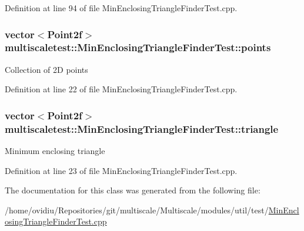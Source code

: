 Definition at line 94 of file Min\-Enclosing\-Triangle\-Finder\-Test.\-cpp.

\hypertarget{classmultiscaletest_1_1MinEnclosingTriangleFinderTest_ace108c67a933a0d79c05b304a9683764}{
\subsubsection[{points}]{\setlength{\rightskip}{0pt plus 5cm}vector$<$Point2f$>$ multiscaletest\-::\-Min\-Enclosing\-Triangle\-Finder\-Test\-::points\hspace{0.3cm}{\ttfamily [protected]}}}\label{classmultiscaletest_1_1MinEnclosingTriangleFinderTest_ace108c67a933a0d79c05b304a9683764}
Collection of 2\-D points 

Definition at line 22 of file Min\-Enclosing\-Triangle\-Finder\-Test.\-cpp.

\hypertarget{classmultiscaletest_1_1MinEnclosingTriangleFinderTest_a02aa9bcd10630d27293e656233e3f64e}{
\subsubsection[{triangle}]{\setlength{\rightskip}{0pt plus 5cm}vector$<$Point2f$>$ multiscaletest\-::\-Min\-Enclosing\-Triangle\-Finder\-Test\-::triangle\hspace{0.3cm}{\ttfamily [protected]}}}\label{classmultiscaletest_1_1MinEnclosingTriangleFinderTest_a02aa9bcd10630d27293e656233e3f64e}
Minimum enclosing triangle 

Definition at line 23 of file Min\-Enclosing\-Triangle\-Finder\-Test.\-cpp.



The documentation for this class was generated from the following file\-:\begin{DoxyCompactItemize}
\item 
/home/ovidiu/\-Repositories/git/multiscale/\-Multiscale/modules/util/test/\hyperlink{MinEnclosingTriangleFinderTest_8cpp}{Min\-Enclosing\-Triangle\-Finder\-Test.\-cpp}\end{DoxyCompactItemize}

